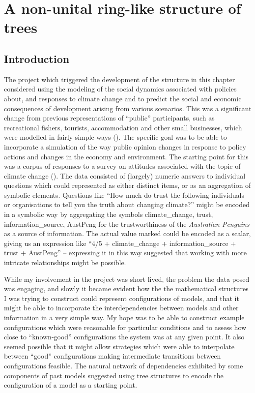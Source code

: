 
\chapter[A RING-LIKE STRUCTURE OF TREES]{A non-unital ring-like structure of trees}\label{treering}
\section{Introduction}
The project which triggered the development of the structure in this
chapter considered using the modeling of the social dynamics
associated with policies about, and responses to climate change and to
predict the social and economic consequences of development arising
from various scenarios. This was a significant change from previous
representations of ``public'' participants, such as recreational
fishers, tourists, accommodation and other small businesses, which were
modelled in fairly simple ways (\cite{fulton2011ningaloo,gray2014}).
The specific goal was to be able to incorporate a simulation of the
way public opinion changes in response to policy actions and changes
in the economy and environment.  The starting point for this was a
corpus of responses to a survey on attitudes associated with the topic
of climate change (\cite{boschetti2012}). The data consisted of
(largely) numeric answers to individual questions which could
represented as either distinct items, or as an aggregation of symbolic
elements.  Questions like ``How much do trust the following
individuals or organisations to tell you the truth about changing
climate?'' might be encoded in a symbolic way by aggregating the
symbols \textsf{climate\_change, trust, information\_source, AustPeng}
for the trustworthiness of the \emph{Australian Penguins} as a source
of information. The actual value marked could be encoded as a scalar,
giving us an expression like ``\textsf{4/5 + climate\_change +
  information\_source + trust + AustPeng}'' -- expressing it in this
way suggested that working with more intricate relationships might be
possible.

While my involvement in the project was short lived, the problem the
data posed was engaging, and slowly it became evident how the the
mathematical structures I was trying to construct could represent
configurations of models, and that it might be able to incorporate the
interdependencies between models and other information in a very
simple way.  My hope was to be able to construct example
configurations which were reasonable for particular conditions and to
assess how close to ``known-good'' configurations the system was at
any given point.  It also seemed possible that it might allow
strategies which were able to interpolate between ``good''
configurations making intermediate transitions between configurations
feasible. The natural network of dependencies exhibited by some
components of past models suggested using tree structures to encode
the configuration of a model as a starting point.

